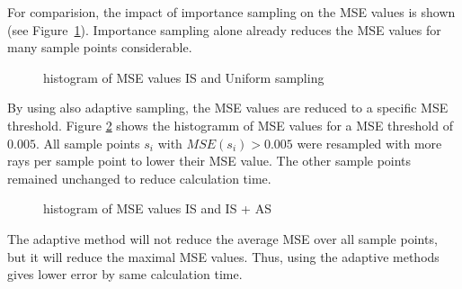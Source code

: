 For comparision, the impact of importance sampling
on the MSE values is shown (see Figure~\ref{plot:importance2}). 
Importance sampling alone already reduces the MSE values for
many sample points considerable.
\begin{figure}[H]
  \centerline{
    }
  \caption{histogram of MSE values IS and Uniform sampling}
  \label{plot:importance2}
\end{figure}
By using also adaptive sampling, the MSE values are reduced to a specific MSE threshold.
Figure \ref{plot:adaptive} shows the histogramm of MSE values for a MSE threshold
of $0.005$. All sample points $s_i$ with $MSE(s_i) > 0.005$ were resampled with more rays
per sample point to lower their MSE value. The other sample points remained unchanged
to reduce calculation time.
\begin{figure}[H]
  \centerline{
    }
  \caption{histogram of MSE values IS and IS + AS}
  \label{plot:adaptive}
\end{figure}
The adaptive method will not reduce the average MSE over all sample points,
but it will reduce the maximal MSE values. Thus, using the adaptive
methods gives lower error by same calculation time.

